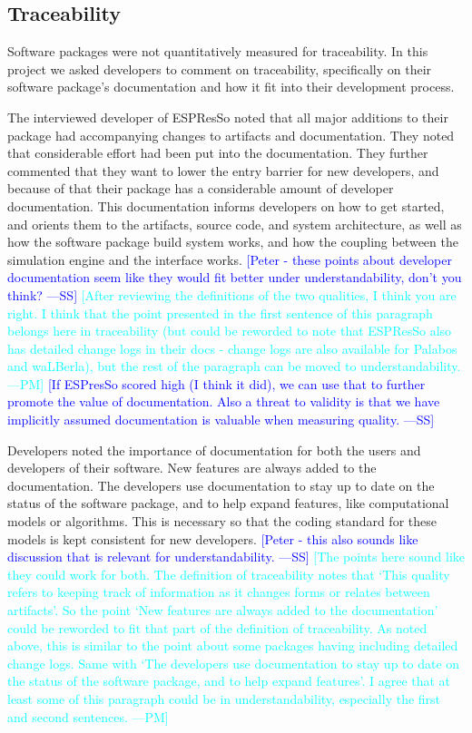 \documentclass[final, 3p, times, authoryear]{elsarticle}
\newcommand{\authornote}[3]{\textcolor{#1}{[#3 ---#2]}}
\newcommand{\authornote}[3]{}
\newcommand{\wss}[1]{\authornote{blue}{SS}{#1}} %
\newcommand{\pmm}[1]{\authornote{cyan}{PM}{#1}} %
\begin{document}
\subsection{Traceability}

Software packages were not quantitatively measured for traceability. In this
project we asked developers to comment on traceability, specifically on their
software package's documentation and how it fit into their development process. 

The interviewed developer of ESPResSo noted that all major additions to their
package had accompanying changes to artifacts and documentation. They noted that
considerable effort had been put into the documentation. They further commented
that they want to lower the entry barrier for new developers, and because of
that their package has a considerable amount of developer documentation. This
documentation informs developers on how to get started, and orients them to the
artifacts, source code, and system architecture, as well as how the software
package build system works, and how the coupling between the simulation engine
and the interface works.  \wss{Peter - these points about developer
documentation seem like they would fit better under understandability, don't you
think?}  \pmm{After reviewing the definitions of the two qualities, I think you
are right. I think that the point presented in the first sentence of this
paragraph belongs here in traceability (but could be reworded to note that
ESPResSo also has detailed change logs in their docs - change logs are also
available for Palabos and waLBerla), but the rest of the paragraph can be moved
to understandability.} \wss{If ESPresSo scored high (I think it did), we can use
that to further promote the value of documentation.  Also a threat to validity
is that we have implicitly assumed documentation is valuable when measuring
quality.}

Developers noted the importance of documentation for both the users and
developers of their software. New features are always added to the
documentation. The developers use documentation to stay up to date on the status
of the software package, and to help expand features, like computational models
or algorithms. This is necessary so that the coding standard for these models is
kept consistent for new developers. \wss{Peter - this also sounds like
discussion that is relevant for understandability.} \pmm{The points here sound
like they could work for both. The definition of traceability notes that `This
quality refers to keeping track of information as it changes forms or relates
between artifacts'. So the point `New features are always added to the
documentation' could be reworded to fit that part of the definition of
traceability. As noted above, this is similar to the point about some packages
having including detailed change logs. Same with `The developers use
documentation to stay up to date on the status of the software package, and to
help expand features'. I agree that at least some of this paragraph could be in
understandability, especially the first and second sentences.}
\end{document}
